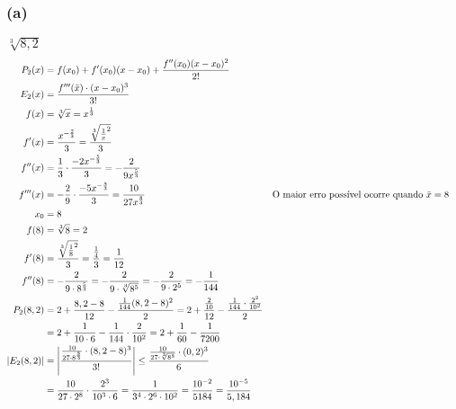 \documentclass{article}
\begin{document}
\subsubsection{(a)}
$\sqrt[3]{8,2}$
\begin{align}
  P_2(x)
  &= f(x_0) + f'(x_0)(x-x_0) + \frac{f''(x_0)(x-x_0)^2} {2!} \\
  E_2(x)
  &= \frac{f'''(\bar{x}) \cdot (x-x_0)^3}{3!} \\
  f(x)
  &= \sqrt[3]{x}
  = x^{\frac{1}{3}} \\
  f'(x)
  &= \frac{x^{-\frac{2}{3}}}{3}
  = \frac{\sqrt[3]{\frac{1}{x}^2}}{3} \\
  f''(x)
  &= \frac{1}{3} \cdot \frac{-2x^{-\frac{5}{3}}}{3}
  = -\frac{2}{9x^{\frac{5}{3}}} \\
  f'''(x)
  &= - \frac{2}{9} \cdot \frac{-5x^{-\frac{8}{3}}}{3}
  = \frac{10}{27x^{\frac{8}{3}}}
  && \text{O maior erro possível ocorre quando $\bar{x} = 8$} \\
  x_0
  &= 8 \\
  f(8)
  &= \sqrt[3]{8}
  = 2 \\
  f'(8)
  &= \frac{\sqrt[3]{\frac{1}{8}^2}}{3}
  = \frac{\frac{1}{4}}{3}
  = \frac{1}{12} \\
  f''(8)
  &= -\frac{2}{9 \cdot 8^{\frac{5}{3}}}
  = -\frac{2}{9 \cdot \sqrt[3]{8^5}}
  = -\frac{2}{9 \cdot 2^5}
  = -\frac{1}{144} \\
  P_2(8,2)
  &= 2 + \frac{8,2 - 8}{12} - \frac{\frac{1}{144}(8,2 - 8)^2}{2}
  = 2 + \frac{\frac{2}{10}}{12} - \frac{\frac{1}{144} \cdot \frac{2^2}{10^2}}{2} \\
  &= 2 + \frac{1}{10 \cdot 6} - \frac{1}{144} \cdot \frac{2}{10^2}
  = 2 + \frac{1}{60} - \frac{1}{7200} \notag \\
  |E_2(8,2)|
  &= \left|\frac{\frac{10}{27 \cdot 8^{\frac{8}{3}}} \cdot (8,2 - 8)^3}{3!}\right|
  \leq \frac{\frac{10}{27 \cdot \sqrt[3]{8^8}} \cdot (0,2)^3}{6} \\
  &= \frac{10}{27 \cdot 2^8} \cdot \frac{2^3}{10^3 \cdot 6}
  = \frac{1}{3^4 \cdot 2^6 \cdot 10^2}
  = \frac{10^{-2}}{5184}
  = \frac{10^{-5}}{5,184} \notag
\end{align}
\setcounter{equation}{0}
\clearpage
\end{document}
